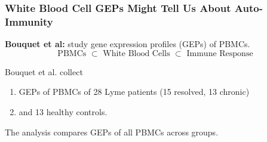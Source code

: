 \documentclass[usenames,dvipsnames,15pt]{beamer}
\begin{document}
\begin{frame}
  \frametitle{White Blood Cell GEPs Might Tell Us About Auto-Immunity}
             {\bf Bouquet et al:} study gene expression profiles (GEPs) of PBMCs.
             \[\text{PBMCs $\subset$ White Blood Cells $\subset$ Immune Response}\]

             \vspace{-.5cm}Bouquet et al. collect
             \begin{enumerate}
             \item GEPs of PBMCs of \alert{28 Lyme patients} (15 resolved, 13 chronic)
             \item and \alert{13 healthy controls}.
             \end{enumerate}

             The analysis compares GEPs of all PBMCs across groups.\\

             \vspace{.5cm}
\end{frame}
\end{document}
